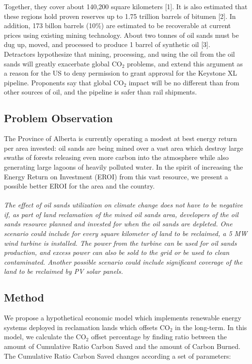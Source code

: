 \documentclass[11pt]{article}
\begin{document}
\indent Together, they cover about 140,200 square kilometers [1]. It is also estimated that these regions hold proven reserves up to 1.75 trillion barrels of bitumen [2]. In addition, 173 billon barrels (10\%) are estimated to be recoverable at current prices using existing mining technology. About two tonnes of oil sands must be dug up, moved, and processed to produce 1 barrel of synthetic oil [3].  \\
\indent Detractors hypothesize that mining, processing, and using the oil from the oil sands will greatly exacerbate global CO$_2$ problems, and extend this argument as a reason for the US to deny permission to grant approval for the Keystone XL pipeline. Proponents say that global CO$_2$ impact will be no different than from other sources of oil, and the pipeline is safer than rail shipments. 

\subsection{Problem Observation}

The Province of Alberta is currently operating a modest at best energy return per area invested: oil sands are being mined over a vast area which destroy large swaths of forests releasing even more carbon into the atmosphere while also generating large lagoons of heavily polluted water. In the spirit of increasing the Energy Return on Investment (EROI) from this vast resource, we present a possible better EROI for the area and the country.  \\

 \\

\emph{The effect of oil sands utilization on climate change does not have to be negative if, as part of land reclamation of the mined oil sands area, developers of the oil sands resource planned and invested for when the oil sands are depleted. One scenario could include for every square kilometer of land to be reclaimed, a 5 MW wind turbine is installed. The power from the turbine can be used for oil sands production, and excess power can also be sold to the grid or be used to clean contaminated. Another possible scenario could include significant coverage of the land to be reclaimed by PV solar panels. } \\
  
\subsection{Method}
We propose a hypothetical economic model which implements renewable energy systems deployed in reclamation lands which offsets CO$_2$ in the long-term. In this model, we calculate the CO$_2$ offset percentage by finding ratio between the amount of Cumulative Ratio Carbon Saved and the amount of Carbon Burned. The Cumulative Ratio Carbon Saved changes according a set of parameters:
\end{document}
